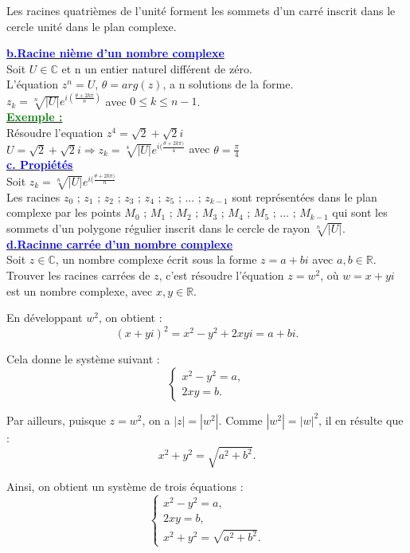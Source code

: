 \documentclass[12pt]{article}
\newcounter{exemple} %
\newcommand{\exemple}{%
  \refstepcounter{exemple}%
  \textbf{\textcolor{green}{Exemple \theexemple :}} \ignorespaces
}
\begin{document}
Les racines quatrièmes de l'unité forment les sommets d'un carré inscrit dans le cercle unité dans le plan complexe.

\underline{\textbf{\textcolor{blue}{b.Racine nième d'un nombre complexe}}}\\
Soit $U \in \mathbb{C}$ et n un entier naturel différent de zéro.\\
L'équation $z^{n}=U$, $\theta=arg(z)$, a n solutions de la forme.\\
$z_{k}=\sqrt[n]{|U|}e^{i(\frac{\theta+2k\pi}{n})}$ avec $ 0\leq k \leq n-1 $.\\
\underline{\exemple}\\
Résoudre l'equation $z^{4}=\sqrt{2}+\sqrt{2}i$\\
$U=\sqrt{2}+\sqrt{2}i \Longrightarrow z_{k}=\sqrt[4]{|U|}e^{i(\frac{\theta+2k\pi)}{4}}$ avec 
$\theta=\frac{\pi}{4}$\\
\underline{\textbf{\textcolor{blue}{c. Propiétés}}}\\
Soit $z_{k}=\sqrt[n]{|U|}e^{i(\frac{\theta+2k\pi)}{n}}$\\
Les racines $z_{0}$ ; $z_{1}$ ; $z_{2}$ ; $z_{3}$ ; $z_{4}$ ; $z_{5}$ ; ... ; $z_{k-1}$ sont représentées dans le plan complexe par les points $M_{0}$ ; $M_{1}$ ; $M_{2}$ ; $M_{3}$ ; $M_{4}$ ; $M_{5}$ ; ... ; $M_{k-1}$ qui sont les sommets d’un polygone régulier inscrit dans le cercle de rayon $\sqrt[n]{|U|}$.\\
\underline{\textbf{\textcolor{blue}{d.Racinne carrée d'un nombre complexe}}}\\
Soit \( z \in \mathbb{C} \), un nombre complexe écrit sous la forme \( z = a + bi \) avec \( a, b \in \mathbb{R} \).  
Trouver les racines carrées de \( z \), c'est résoudre l'équation \( z = w^2  \), où \( w = x + yi \) est un nombre complexe, avec \( x, y \in \mathbb{R} \).  

En développant \( w^2 \), on obtient :  
\[
(x + yi)^2 = x^2 - y^2 + 2xyi = a + bi.
\]

Cela donne le système suivant :
\[
\begin{cases}
x^2 - y^2 = a, \\
2xy = b.
\end{cases}
\]

Par ailleurs, puisque \( z = w^2 \), on a \( |z| = |w^2| \). Comme \( |w^2| = |w|^2 \), il en résulte que :  
\[
x^2 + y^2 = \sqrt{a^2 + b^2}.
\]

Ainsi, on obtient un système de trois équations :  
\[
\begin{cases}
x^2 - y^2 = a, \\
2xy = b, \\
x^2 + y^2 = \sqrt{a^2 + b^2}.
\end{cases}
\]
\end{document}
